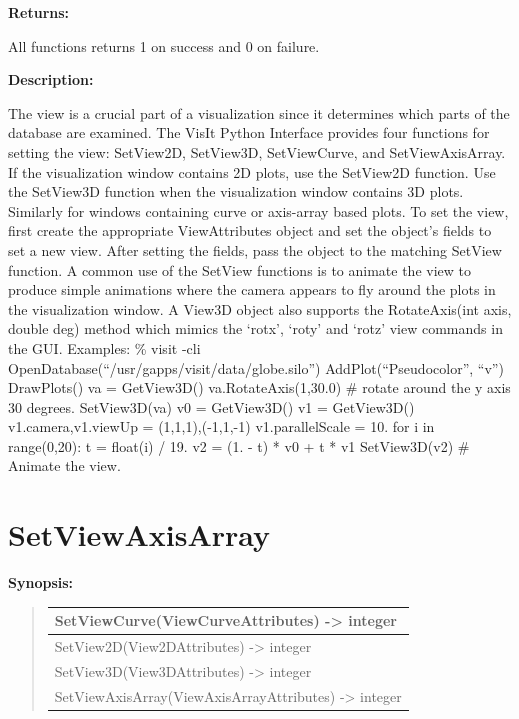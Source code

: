 \documentclass[letterpaper,10pt,english]{sphinxmanual}
\begin{document}
\begin{DUlineblock}{0em}
\item[] 
\item[] \textbf{Returns:}
\item[] All functions returns 1 on success and 0 on failure.
\item[] 
\item[] \textbf{Description:}
\item[] The view is a crucial part of a visualization since it determines
which parts of the database are examined. The VisIt Python Interface
provides four functions for setting the view: SetView2D, SetView3D,
SetViewCurve, and SetViewAxisArray. If the visualization window
contains 2D plots, use the SetView2D function. Use the SetView3D
function when the visualization window contains 3D plots.  Similarly
for windows containing curve or axis-array based plots.  To set the
view, first create the appropriate ViewAttributes object and set the
object's fields to set a new view. After setting the fields, pass the
object to the matching SetView function. A common use of the SetView
functions is to animate the view to produce simple animations where
the camera appears to fly around the plots in the visualization
window.
A View3D object also supports the RotateAxis(int axis, double deg)
method which mimics the `rotx', `roty' and `rotz' view commands in
the GUI.
Examples:
\% visit -cli
OpenDatabase(``/usr/gapps/visit/data/globe.silo'')
AddPlot(``Pseudocolor'', ``v'')
DrawPlots()
va = GetView3D()
va.RotateAxis(1,30.0) \# rotate around the y axis 30 degrees.
SetView3D(va)
v0 = GetView3D()
v1 = GetView3D()
v1.camera,v1.viewUp = (1,1,1),(-1,1,-1)
v1.parallelScale = 10.
for i in range(0,20):
t = float(i) / 19.
v2 = (1. - t) * v0 + t * v1
SetView3D(v2) \# Animate the view.
\end{DUlineblock}

\begin{DUlineblock}{0em}
\item[] 
\end{DUlineblock}


\section{SetViewAxisArray}
\label{functions:setviewaxisarray}
\begin{DUlineblock}{0em}
\item[] \textbf{Synopsis:}
\end{DUlineblock}
\begin{quote}

\begin{tabulary}{\linewidth}{|L|}
\hline

SetViewCurve(ViewCurveAttributes) -\textgreater{} integer
\\
\hline
SetView2D(View2DAttributes) -\textgreater{} integer
\\
\hline
SetView3D(View3DAttributes) -\textgreater{} integer
\\
\hline
SetViewAxisArray(ViewAxisArrayAttributes) -\textgreater{} integer
\\
\hline\end{tabulary}

\end{quote}
\end{document}
